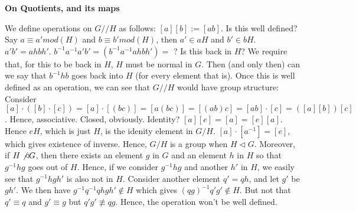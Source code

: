 \documentclass[../Main.tex]{subfiles}
\begin{document}

\begin{center}
\textbf{On Quotients, and its maps}
\end{center}
We define operations on $G//H$ as follows: $[a][b]:=[ab]$. Is this well defined? Say $a\equiv a' mod(H)$ and $b \equiv b' mod(H)$, then $a' \in aH$ and $b' \in bH$. $a'b'=ahbh'$. $b^{-1}a^{-1}a'b'=(b^{-1}a^{-1}ahbh')=$ ? Is this back in $H$? We require that, for this to be back in $H$, $H$ must be normal in $G$. Then (and only then) can we say that $b^{-1}hb$ goes back into $H$ (for every element that is). Once this is well defined as an operation, we can see that $G//H$ would have group structure:
Consider $[a] \cdot([b]\cdot [c])=[a]\cdot[(bc)]=[a(bc)]=[(ab)c]=[ab]\cdot[c]=([a][b])[c]$. Hence, associative.
Closed, obviously. Identity? $[a][e]=[a]=[e][a]$. Hence $eH$, which is just $H$, is the idenity element in $G/H$. $[a] \cdot [a^{-1}]=[e]$, which gives existence of inverse. Hence, $G/H$ is a group when $H \triangleleft G$. Moreover, if $H \not \triangleleft G$, then there exists an element $g$ in $G$ and an element $h$ in $H$ so that $g^{-1}hg$ goes out of $H$. Hence, if we consider $g^{-1}hg$ and another $h'$ in $H$, we easily see that $g^{-1}hgh'$ is also not in $H$. Consider another element $q'=qh$, and let $g'$ be $gh'$. We then have $g^{-1}q^{-1}qhgh' \not \in H$ which gives $(qg)^{-1}q'g' \not \in H$. But not that $q' \equiv q$ and $g' \equiv g$ but $q'g' \not \equiv qg$. Hence, the operation won't be well defined.
\end{document}
